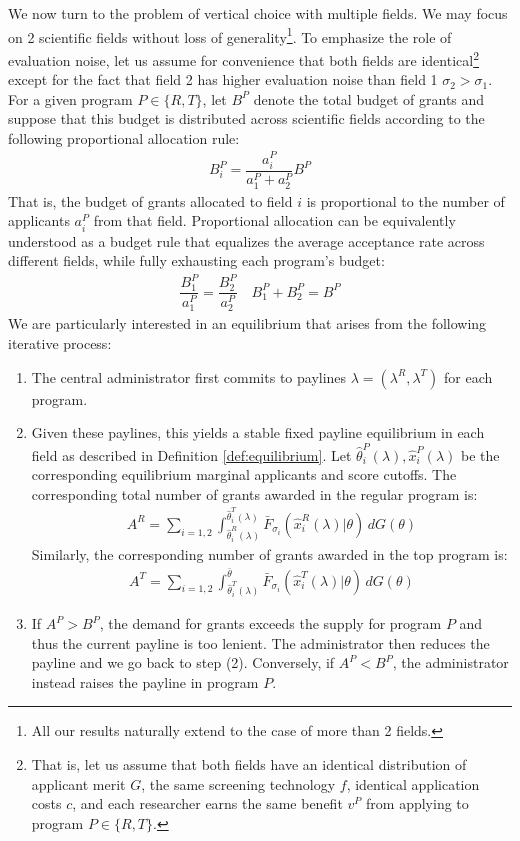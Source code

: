 \documentclass[12pt,reqno]{amsart}
\theoremstyle{definition}
\theoremstyle{plain} %
\begin{document}
\noindent We now turn to the problem of vertical choice with multiple fields. We may focus on 2 scientific fields without loss of generality\footnote{All our results naturally extend to the case of more than 2 fields.}. To emphasize the role of evaluation noise, let us assume for convenience that both fields are identical\footnote{That is, let us assume that both fields have an identical distribution of applicant merit $G$, the same screening technology $f$, identical application costs $c$, and each researcher earns the same benefit $v^P$ from applying to program $P\in \{R,T\}$.} except for the fact that field 2 has higher evaluation noise than field 1 $\sigma_2>\sigma_1$. For a given program $P\in\{R,T\}$, let $B^P$ denote the total budget of grants and suppose that this budget is distributed across scientific fields according to the following proportional allocation rule:
\begin{align*}
    B_i^P = \dfrac{a_i^P}{a_1^P+a_2^P}B^P
\end{align*}
That is, the budget of grants allocated to field $i$ is proportional to the number of applicants $a_i^P$ from that field. Proportional allocation can be equivalently understood as a budget rule that equalizes the average acceptance rate across different fields, while fully exhausting each program's budget:
\begin{align*}
    \dfrac{B_1^P}{a_1^P} = \dfrac{B_2^P}{a_2^P} \quad B_1^P + B_2^P = B^P
\end{align*}
We are particularly interested in an equilibrium that arises from the following iterative process:
\vspace{-5pt}
\begin{enumerate}[label=(\arabic*),ref=\thelemma(\arabic*)]
  \item The central administrator first commits to paylines $\lambda = (\lambda^R,\lambda^T)$ for each program. 
  \item Given these paylines, this yields a stable fixed payline equilibrium in each field as described in Definition \ref{def:equilibrium}. Let  $\hat{\theta}_i^P(\lambda), \hat{x}^P_i(\lambda)$ be the corresponding equilibrium marginal applicants and score cutoffs. The corresponding total number of grants awarded in the regular program is:
  \begin{align*}
      A^R = \sum_{i=1,2}\int_{\hat{\theta}_i^R(\lambda)}^{\hat{\theta}_i^T(\lambda)}\bar{F}_{\sigma_i}(\hat{x}^R_i(\lambda)|\theta) \,dG(\theta)
   \end{align*}
   Similarly, the corresponding number of grants awarded in the top program is:
   \begin{align*}
      A^T = \sum_{i=1,2}\int_{\hat{\theta}_i^T(\lambda)}^{\bar{\theta}}\bar{F}_{\sigma_i}(\hat{x}^T_i(\lambda)|\theta) \,dG(\theta)
   \end{align*}
   \item If $A^P > B^P$, the demand for grants exceeds the supply for program $P$ and thus the current payline is too lenient. The administrator then reduces the payline and we go back to step (2). Conversely, if $A^P < B^P$, the administrator instead raises the payline in program $P$. 
\end{enumerate} 
\end{document}
